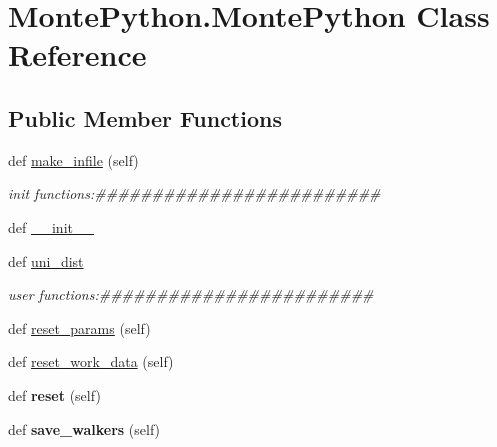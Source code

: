 \hypertarget{classMontePython_1_1MontePython}{}\section{Monte\+Python.\+Monte\+Python Class Reference}
\label{classMontePython_1_1MontePython}
\subsection*{Public Member Functions}
\begin{DoxyCompactItemize}
\item 
\hypertarget{classMontePython_1_1MontePython_ac5c9d52934b757556ee2abd6a429d324}{}def \hyperlink{classMontePython_1_1MontePython_ac5c9d52934b757556ee2abd6a429d324}{make\+\_\+infile} (self)\label{classMontePython_1_1MontePython_ac5c9d52934b757556ee2abd6a429d324}

\begin{DoxyCompactList}\small\item\em init functions\+:\#\#\#\#\#\#\#\#\#\#\#\#\#\#\#\#\#\#\#\#\#\#\#\#\# \end{DoxyCompactList}\item 
def \hyperlink{classMontePython_1_1MontePython_a35a41363f97309bcee95129d52f41db5}{\+\_\+\+\_\+init\+\_\+\+\_\+}
\item 
def \hyperlink{classMontePython_1_1MontePython_ac152997e855fb5416e29256177cbd8fd}{uni\+\_\+dist}
\begin{DoxyCompactList}\small\item\em user functions\+:\#\#\#\#\#\#\#\#\#\#\#\#\#\#\#\#\#\#\#\#\#\#\#\# \end{DoxyCompactList}\item 
def \hyperlink{classMontePython_1_1MontePython_aeb81100ae938bf567a87d2d4e899a359}{reset\+\_\+params} (self)
\item 
def \hyperlink{classMontePython_1_1MontePython_a5c96e4a549e78b80d4e11b4bce70089d}{reset\+\_\+work\+\_\+data} (self)
\item 
\hypertarget{classMontePython_1_1MontePython_a8ae81fa23feb2c6c4be262ff31f2d73a}{}def {\bfseries reset} (self)\label{classMontePython_1_1MontePython_a8ae81fa23feb2c6c4be262ff31f2d73a}

\item 
\hypertarget{classMontePython_1_1MontePython_a87f76e8605d36f2b755799b5908c8b28}{}def {\bfseries save\+\_\+walkers} (self)\label{classMontePython_1_1MontePython_a87f76e8605d36f2b755799b5908c8b28}


\end{DoxyCompactItemize}
